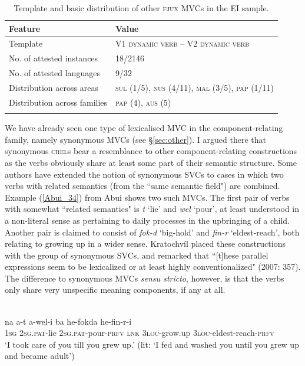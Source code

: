 \begin{table}
\begin{tabular}{ll}
\lsptoprule
Feature&Value\tabularnewline
\hline
Template& V1 \textsc{dynamic verb} -- V2 \textsc{dynamic verb}\tabularnewline
No. of attested instances& 18/2146 \tabularnewline
No. of attested languages& 9/32 \tabularnewline
Distribution across areas& \textsc{sul} (1/5), \textsc{nus} (4/11), \textsc{mal} (3/5), \textsc{pap} (1/11) \tabularnewline
Distribution across families& \textsc{pap} (4), \textsc{aus} (5) \tabularnewline
\lspbottomrule
\end{tabular}
\caption[Template and basic distribution of other \textsc{fjux} MVCs]{Template and basic distribution of other \textsc{fjux} MVCs in the EI sample.}
\label{table:other_fjux}
\end{table}

We have already seen one type of lexicalised MVC in the component-relating family, namely synonymous MVCs (see §\ref{sec:other}). I argued there that synonymous \textsc{crel}s bear a resemblance to other component-relating constructions as the verbs obviously share at least some part of their semantic structure. Some authors have extended the notion of synonymous SVCs to cases in which two verbs with related semantics (from the ``same semantic field") are combined. Example (\ref{Abui_34}) from Abui shows two such MVCs. The first pair of verbs with somewhat ``related semantics" is \textit{t} `lie' and \textit{wel} `pour', at least understood in a non-literal sense as pertaining to daily processes in the upbringing of a child. Another pair is claimed to consist of \textit{fok-d} `big-hold' and \textit{fin-r} `eldest-reach', both relating to growing up in a wider sense. Kratochvíl placed these constructions with the group of synonymous SVCs, and remarked that ``[t]hese parallel expressions seem to be lexicalized or at least highly conventionalized" (2007: 357). The difference to synonymous MVCs \textit{sensu stricto}, however, is that the verbs only share very unspecific meaning components, if any at all.

\ea \label{Abui_34}
\\
\gll na a-t a-wel-i ba he-fokda he-fin-r-i \\
1\textsc{sg} 2\textsc{sg}.\textsc{pat}-lie 2\textsc{sg}.\textsc{pat}-pour-\textsc{prfv} \textsc{lnk} 3\textsc{loc}-grow.up 3\textsc{loc}-eldest-reach-\textsc{prfv} \\
\glft ‘I took care of you till you grew up.’ (lit: ‘I fed and washed you until you grew up and
became adult’)\\
\z


